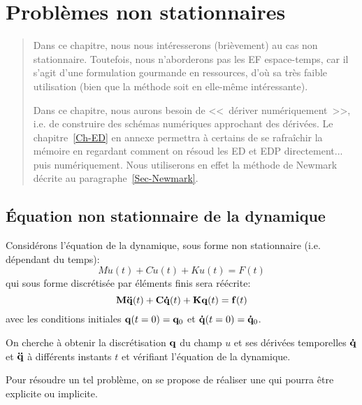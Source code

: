 \chapter{Problèmes non stationnaires}\label{Ch-temps}
\begin{abstract}
Dans ce chapitre, nous nous intéresserons (brièvement) au cas non stationnaire.
Toutefois, nous n'aborderons pas les EF espace-temps, car il s'agit d'une formulation
gourmande en ressources, d'où sa très faible utilisation (bien que la méthode
soit en elle-même intéressante).

Dans ce chapitre, nous aurons besoin de <<~dériver numériquement~>>, i.e. de
construire des schémas numériques approchant des dérivées.
Le chapitre~\ref{Ch-ED} en annexe permettra à certains de se rafraîchir la mémoire
en regardant comment on résoud les ED et EDP directement... puis numériquement.
Nous utiliserons en effet la méthode de Newmark
 décrite au paragraphe~\ref{Sec-Newmark}.
\end{abstract}

\medskip
\section{Équation non stationnaire de la dynamique}
Considérons l'équation de la dynamique, sous forme non stationnaire (i.e. dépendant du temps):
\begin{equation} M \ddot u(t) + C \dot u(t) + K u(t)= F(t) \end{equation}
qui sous forme discrétisée par éléments finis sera réécrite:
\begin{equation}\colorblue \MM{M}\VV{\ddot q}(t) +  \MM{C}\VV{\dot q}(t) + \MM{K}\VV{q}(t)= \VV{f}(t) \end{equation}
avec les conditions initiales $\VV{q}(t=0)=\VV{q}_0$ et $\VV{\dot q}(t=0)=\VV{\dot q}_0$.

\medskip
On cherche à obtenir la discrétisation $\VV{q}$ du champ $u$ et ses dérivées
temporelles $\VV{\dot q}$ et $\VV{\ddot q}$ à différents instants $t$ et vérifiant l'équation de la dynamique.

\medskip
Pour résoudre un tel problème, on se propose de réaliser une  qui pourra être explicite ou implicite.

